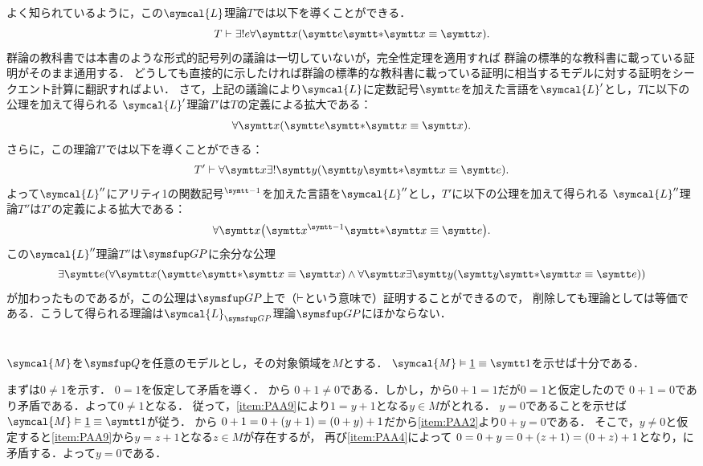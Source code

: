 \subsection*{}

よく知られているように，この\(\symcal{L}\)理論\(T\)では以下を導くことができる．
\[
	T \provable \uexists e \forall \obj{x} \paren{\obj{e} \obj{\ast} \obj{x} \objeq \obj{x}}.
\]
群論の教科書では本書のような形式的記号列の議論は一切していないが，完全性定理を適用すれば
群論の標準的な教科書に載っている証明がそのまま通用する．
どうしても直接的に示したければ群論の標準的な教科書に載っている証明に相当するモデルに対する証明をシークエント計算に翻訳すればよい．
さて，上記の議論により\(\symcal{L}\)に定数記号\(\obj{e}\)を加えた言語を\(\symcal{L}'\)とし，\(T\)に以下の公理を加えて得られる
\(\symcal{L}'\)理論\(T'\)は\(T\)の定義による拡大である：
\[
	\forall \obj{x} \paren{\obj{e} \obj{\ast} \obj{x} \objeq \obj{x}}.
\]
さらに，この理論\(T'\)では以下を導くことができる：
\[
	T' \provable \forall \obj{x} \uexists \obj{y} \paren{\obj{y} \obj{\ast} \obj{x} \objeq \obj{e}}.
\]
よって\(\symcal{L}''\)にアリティ1の関数記号\({}^{\obj{-1}}\)を加えた言語を\(\symcal{L}''\)とし，\(T'\)に以下の公理を加えて得られる
\(\symcal{L}''\)理論\(T''\)は\(T'\)の定義による拡大である：
\[
	\forall \obj{x} \paren{\obj{x}^{\obj{-1}} \obj{\ast} \obj{x} \objeq \obj{e}}.
\]
この\(\symcal{L}''\)理論\(T''\)は\(\GP\)に余分な公理
\[
	\exists \obj{e} \paren{\forall \obj{x} \paren{\obj{e} \obj{\ast} \obj{x} \objeq \obj{x}} \land \forall \obj{x} \exists \obj{y} \paren{\obj{y} \obj{\ast} \obj{x} \objeq \obj{e}}}
\]
が加わったものであるが，この公理は\(\GP\)上で（\(\vdash\)という意味で）証明することができるので，
削除しても理論としては等価である．こうして得られる理論は\(\symcal{L}_{\GP}\)理論\(\GP\)にほかならない．



\section*{}

\subsection*{}

\(\symcal{M}\)を\(\Robinson\)を任意のモデルとし，その対象領域を\(M\)とする．
\(\symcal{M} \satisfy \numeral{1} \objeq \obj{1}\)を示せば十分である．

まずは\(0 \neq 1\)を示す．
\(0 = 1\)を仮定して矛盾を導く．
から
\(0 + 1 \neq 0\)である．しかし，から\(0 + 1 = 1\)だが\(0 = 1\)と仮定したので
\(0 + 1 = 0\)であり矛盾である．よって\(0 \neq 1\)となる．
従って，\cref{item:PAA9}により\(1 = y + 1\)となる\(y \in M\)がとれる．
\(y = 0\)であることを示せば\(\symcal{M} \satisfy \numeral{1} \objeq \obj{1}\)が従う．
から
\(0 + 1 = 0 + \paren{y + 1} = \paren{0 + y} + 1\)だから\cref{item:PAA2}より\(0 + y = 0\)である．
そこで，\(y \neq 0\)と仮定すると\cref{item:PAA9}から\(y = z + 1\)となる\(z \in M\)が存在するが，
再び\cref{item:PAA4}によって
\(0 = 0 + y = 0 + \paren{z + 1} = \paren{0 + z} + 1\)となり，に矛盾する．よって\(y = 0\)である．


